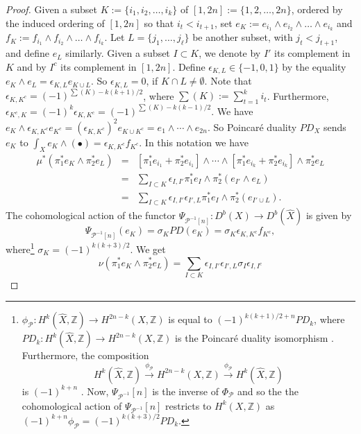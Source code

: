 \documentclass[12pt]{amsart}
\numberwithin{equation}{subsection}
\theoremstyle{plain}
\theoremstyle{definition}
\newcommand{\ZZ}{{\mathbb Z}}
\renewcommand{\P}{{\mathcal P}}
\newcommand{\RightArrowOf}[1]{\stackrel{#1}{\rightarrow}}
\begin{document}
\begin{proof}
Given a subset $K:=\{i_1,i_2,\dots, i_k\}$ of $[1,2n]:=\{1, 2, \dots, 2n\}$, ordered by the induced ordering of $[1,2n]$ so that  $i_t<i_{t+1}$,
set $e_K:=e_{i_1}\wedge e_{i_2}\wedge\dots\wedge e_{i_k}$ and $f_K:=f_{i_1}\wedge f_{i_2}\wedge\dots\wedge f_{i_k}$. 
Let $L=\{j_1, \dots, j_\ell\}$ be another subset, with $j_t<j_{t+1}$, and define $e_L$ similarly.
Given a subset $I\subset K$, we denote by $I'$ its complement in $K$ and by $I^c$ its complement in $[1,2n]$.
Define $\epsilon_{K,L}\in\{-1,0,1\}$ by the equality $e_K\wedge e_L=\epsilon_{K, L}e_{K\cup L}$. So $\epsilon_{K,L}=0$, if $K\cap L\neq\emptyset$. Note that $\epsilon_{K,K^c}=(-1)^{\sum(K)-k(k+1)/2}$, where $\sum(K):=\sum_{t=1}^k i_t$.
Furthermore, $\epsilon_{K^c,K}=(-1)^k\epsilon_{K,K^c}=(-1)^{\sum(K)-k(k-1)/2}$.
We have $e_K\wedge\epsilon_{K,K^c}e_{K^c}=(\epsilon_{K,K^c})^2e_{K\cup K^c}=e_1\wedge\cdots \wedge e_{2n}$. So Poincar\'{e} duality $PD_X$ sends $e_K$ to $\int_Xe_K\wedge(\bullet)=\epsilon_{K,K^c}f_{K^c}$. 
In this notation we have
\begin{eqnarray*}
\mu^*(\pi_1^*e_K\wedge \pi_2^*e_L)&=&
[\pi_1^*e_{i_1}+\pi_2^*e_{i_1}]\wedge\cdots\wedge
[\pi_1^*e_{i_k}+\pi_2^*e_{i_k}]\wedge\pi_2^*e_L
\\
&=&\sum_{I\subset K}\epsilon_{I,I'}\pi_1^*e_I\wedge\pi_2^*(e_{I'}\wedge e_L)
\\
&=&\sum_{I\subset K}\epsilon_{I,I'}\epsilon_{I',L}\pi_1^*e_I\wedge\pi_2^*(e_{I'\cup L}).
\end{eqnarray*}
The cohomological action of the functor $\Psi_{\P^{-1}[n]}:D^b(X)\rightarrow D^b(\hat{X})$ is given by 
\[
\Psi_{\P^{-1}[n]}(e_K)=\sigma_K PD(e_K)=\sigma_K\epsilon_{K,K^c}f_{K^c},
\]
where\footnote{
$\phi_\P:H^k(\hat{X},\ZZ)\rightarrow H^{2n-k}(X,\ZZ)$ is equal to $(-1)^{k(k+1)/2+n} PD_k$, where $PD_k:H^k(\hat{X},\ZZ)\rightarrow H^{2n-k}(X,\ZZ)$ is the Poincar\'{e} duality isomorphism \cite[Lemma 9.23]{huybrechts-derived-categories-book}. Furthermore, the composition
\[
H^k(\hat{X},\ZZ)\RightArrowOf{\phi_\P}H^{2n-k}(X,\ZZ)\RightArrowOf{\phi_\P} H^k(\hat{X},\ZZ)
\]
is $(-1)^{k+n}$ \cite[Cor. 9.24]{huybrechts-derived-categories-book}. Now, $\Psi_{\P^{-1}}[n]$ is the inverse of $\Phi_\P$ and so the the cohomological action of $\Psi_{\P^{-1}}[n]$
restricts to $H^k(X,\ZZ)$ as $(-1)^{k+n}\phi_\P=(-1)^{k(k+3)/2}PD_k$.
} 
$\sigma_K=(-1)^{k(k+3)/2}$. 
We get
\[
\nu(\pi_1^*e_K\wedge \pi_2^*e_L)=
\sum_{I\subset K}\epsilon_{I,I'}\epsilon_{I',L}\sigma_I
\epsilon_{I,I^c}
\]
\end{proof}
\end{document}

